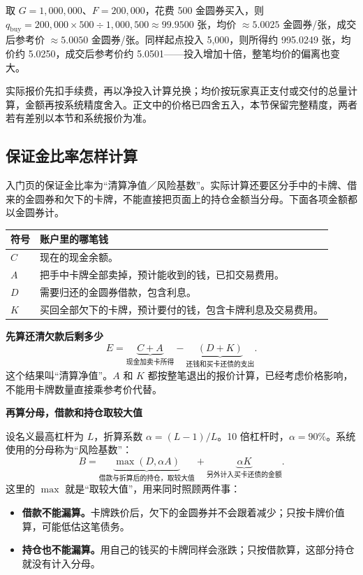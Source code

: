 \documentclass[11pt,a4paper,twoside]{article}
\newcommand{\gold}{金圆券}
\begin{document}
取 $G=1{,}000{,}000$、$F=200{,}000$，花费 500 \gold{}买入，则 $q_{\mathrm{buy}}=200{,}000\times500\div1{,}000{,}500\approx99.9500$ 张，均价 $\approx5.0025$ \gold{}/张，成交后参考价 $\approx5.0050$ \gold{}/张。同样起点投入 5,000，则所得约 995.0249 张，均价约 5.0250，成交后参考价约 5.0501——投入增加十倍，整笔均价的偏离也变大。

实际报价先扣手续费，再以净投入计算兑换；均价按玩家真正支付或交付的总量计算，金额再按系统精度舍入。正文中的价格已四舍五入，本节保留完整精度，两者若有差别以本节和系统报价为准。

\clearpage
\begingroup
\small
\setlength{\parskip}{0.3em}
\subsection{保证金比率怎样计算}

入门页的保证金比率为“清算净值／风险基数”。实际计算还要区分手中的卡牌、借来的金圆券和欠下的卡牌，不能直接把页面上的持仓金额当分母。下面各项金额都以金圆券计。

\begin{tabularx}{\linewidth}{@{}l X@{}}
\toprule
符号 & 账户里的哪笔钱 \\
\midrule
$C$ & 现在的现金余额。\\
$A$ & 把手中卡牌全部卖掉，预计能收到的钱，已扣交易费用。\\
$D$ & 需要归还的金圆券借款，包含利息。\\
$K$ & 买回全部欠下的卡牌，预计要付的钱，包含卡牌利息及交易费用。\\
\bottomrule
\end{tabularx}

\medskip
\textbf{先算还清欠款后剩多少}
\[
  E=\underbrace{C+A}_{\text{现金加卖卡所得}}
    -\underbrace{(D+K)}_{\text{还钱和买卡还债的支出}}.
\]
这个结果叫“清算净值”。$A$ 和 $K$ 都按整笔退出的报价计算，已经考虑价格影响，不能用卡牌数量直接乘参考价代替。

\textbf{再算分母，借款和持仓取较大值}

设名义最高杠杆为 $L$，折算系数 $\alpha=(L-1)/L$。10 倍杠杆时，$\alpha=90\%$。系统使用的分母称为“风险基数”：
\[
 B=\underbrace{\max(D,\alpha A)}_{\text{借款与折算后的持仓，取较大值}}
   +\underbrace{\alpha K}_{\text{另外计入买卡还债的金额}}.
\]
这里的 $\max$ 就是“取较大值”，用来同时照顾两件事：
\begin{itemize}[nosep]
  \item \textbf{借款不能漏算。}卡牌跌价后，欠下的金圆券并不会跟着减少；只按卡牌价值算，可能低估这笔债务。
  \item \textbf{持仓也不能漏算。}用自己的钱买的卡牌同样会涨跌；只按借款算，这部分持仓就没有计入分母。
\end{itemize}
\end{document}
